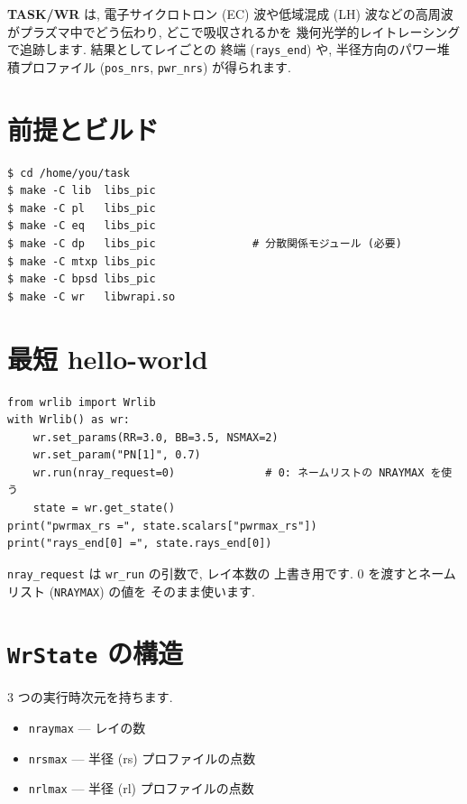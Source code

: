 \documentclass[11pt,a4paper]{report}
\begin{document}
\textbf{TASK/WR} は, 電子サイクロトロン (EC) 波や低域混成 (LH)
波などの高周波がプラズマ中でどう伝わり, どこで吸収されるかを
幾何光学的レイトレーシングで追跡します. 結果としてレイごとの
終端 (\texttt{rays\_end}) や, 半径方向のパワー堆積プロファイル
(\texttt{pos\_nrs}, \texttt{pwr\_nrs}) が得られます.

\section{前提とビルド}

\begin{lstlisting}[style=bash]
$ cd /home/you/task
$ make -C lib  libs_pic
$ make -C pl   libs_pic
$ make -C eq   libs_pic
$ make -C dp   libs_pic               # 分散関係モジュール (必要)
$ make -C mtxp libs_pic
$ make -C bpsd libs_pic
$ make -C wr   libwrapi.so
\end{lstlisting}

\section{最短 hello-world}

\begin{lstlisting}[style=py]
from wrlib import Wrlib
with Wrlib() as wr:
    wr.set_params(RR=3.0, BB=3.5, NSMAX=2)
    wr.set_param("PN[1]", 0.7)
    wr.run(nray_request=0)              # 0: ネームリストの NRAYMAX を使う
    state = wr.get_state()
print("pwrmax_rs =", state.scalars["pwrmax_rs"])
print("rays_end[0] =", state.rays_end[0])
\end{lstlisting}

\begin{note}
\texttt{nray\_request} は \texttt{wr\_run} の引数で, レイ本数の
上書き用です. 0 を渡すとネームリスト (\texttt{NRAYMAX}) の値を
そのまま使います.
\end{note}

\section{\texttt{WrState} の構造}

3 つの実行時次元を持ちます.

\begin{itemize}[leftmargin=1.5em]
  \item \texttt{nraymax} — レイの数
  \item \texttt{nrsmax}  — 半径 (rs) プロファイルの点数
  \item \texttt{nrlmax}  — 半径 (rl) プロファイルの点数
\end{itemize}
\end{document}

